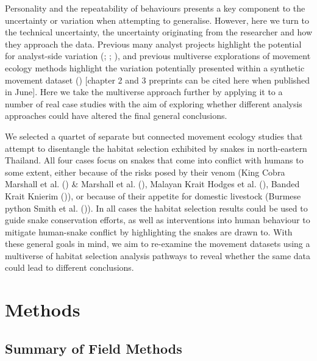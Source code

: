 \documentclass[10pt,a4paper]{article}
\begin{document}
Personality and the repeatability of behaviours presents a key component to the uncertainty or variation when attempting to generalise.
However, here we turn to the technical uncertainty, the uncertainty originating from the researcher and how they approach the data.
Previous many analyst projects highlight the potential for analyst-side variation (; ; ), and previous multiverse explorations of movement ecology methods highlight the variation potentially presented within a synthetic movement dataset () {[}chapter 2 and 3 preprints can be cited here when published in June{]}.
Here we take the multiverse approach further by applying it to a number of real case studies with the aim of exploring whether different analysis approaches could have altered the final general conclusions.

We selected a quartet of separate but connected movement ecology studies that attempt to disentangle the habitat selection exhibited by snakes in north-eastern Thailand.
All four cases focus on snakes that come into conflict with humans to some extent, either because of the risks posed by their venom (King Cobra Marshall et al. () \& Marshall et al. (), Malayan Krait Hodges et al. (), Banded Krait Knierim ()), or because of their appetite for domestic livestock (Burmese python Smith et al. ()).
In all cases the habitat selection results could be used to guide snake conservation efforts, as well as interventions into human behaviour to mitigate human-snake conflict by highlighting the snakes are drawn to.
With these general goals in mind, we aim to re-examine the movement datasets using a multiverse of habitat selection analysis pathways to reveal whether the same data could lead to different conclusions.

\section{Methods}\label{methods}

\subsection{Summary of Field Methods}\label{summary-of-field-methods}
\end{document}
